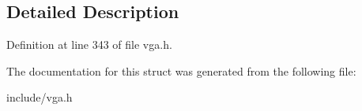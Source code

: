 \subsection{Detailed Description}


Definition at line 343 of file vga.\-h.



The documentation for this struct was generated from the following file\-:\begin{DoxyCompactItemize}
\item 
include/vga.\-h\end{DoxyCompactItemize}
